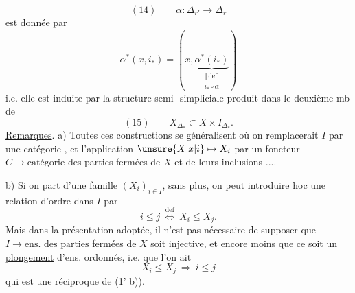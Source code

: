 \[
(14)\qquad\alpha:\Delta_{r'}\longrightarrow\Delta_r
\]
est donnée par
\[
\alpha^*(x,i_*)=(x,\underbrace{\alpha^*(i_*)}_{\substack{\Vert\,\mathrm{def}\\i_*\circ\alpha}})
\]
i.e. elle est induite par la structure semi-
simpliciale produit dans le deuxième mb de
\[
(15)\qquad X_{\Delta_*}\subset X\times I_{\Delta_*}.
\]
\uline{Remarques}. a) Toutes ces constructions se généralisent  où on remplacerait  $I$ par une catégorie , et
l'application $\unsure{X|x|i}\mapsto X_i$ par un foncteur $C\longrightarrow\text{catégorie}$
des parties fermées de $X$ et de leurs inclusions
....

b) Si on part d'une famille $(X_i)_{i\in I}$,  sans
plus, on peut introduire  hoc une relation
d'ordre dans $I$ par 
\[
i\leq j\ \overset{\mathrm{def}}{\Longleftrightarrow}\ X_i\leq X_j.
\]
Mais dans la présentation adoptée, il n'est pas
nécessaire de supposer que  $I\longrightarrow\text{ens. des parties}$
fermées de $X$ soit injective, et encore moins
que ce soit un \uline{plongement} d'ens. ordonnés,
i.e. que l'on ait
\[
X_i\leq X_j\ \Longrightarrow\ i\leq j
\]
qui est une réciproque de (1' b)).
